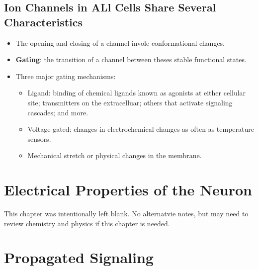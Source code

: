 \documentclass[12pt,a4paper]{article}
\begin{document}
\subsection{Ion Channels in ALl Cells Share Several Characteristics}
\begin{itemize}
    \item The opening and closing of a channel invole conformational changes.
    \item \textbf{Gating}: the transition of a channel between theses stable functional states.
    \item Three major gating mechanisms:
        \begin{itemize}
            \item Ligand: binding of chemical ligands known as agonists at either cellular site; transmitters on the extracelluar; others that activate signaling cascades; and more. 
            \item Voltage-gated: changes in electrochemical changes as often as temperature sensors.
            \item Mechanical stretch or physical changes in the membrane.
        \end{itemize}
\end{itemize}

\clearpage
\section{Electrical Properties of the Neuron}
\begin{center}
    This chapter was intentionally left blank. No alternatvie notes, but may need to review chemistry and physics if this chapter is needed.
\end{center}

\clearpage
\section{Propagated Signaling}
\end{document}
